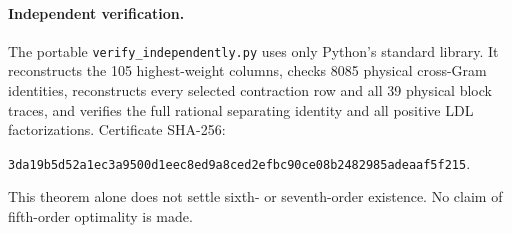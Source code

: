 \documentclass[11pt]{article}
\begin{document}
\paragraph{Independent verification.}
The portable \texttt{verify\_independently.py} uses only Python's standard library. It reconstructs the 105 highest-weight columns, checks 8085 physical cross-Gram identities, reconstructs every selected contraction row and all 39 physical block traces, and verifies the full rational separating identity and all positive LDL factorizations. Certificate SHA-256:
\begin{center}\small\texttt{3da19b5d52a1ec3a9500d1eec8ed9a8ced2efbc90ce08b2482985adeaaf5f215}.\end{center}
This theorem alone does not settle sixth- or seventh-order existence. No claim of fifth-order optimality is made.
\end{document}
